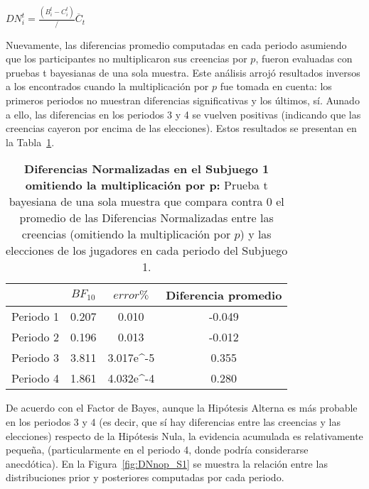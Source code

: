 \begin{center}
$DN_i^t=  \frac{(B_i^t- C_i^t)}/{\overline{C}_t}$ \\
\end{center}

Nuevamente, las diferencias promedio computadas en cada periodo asumiendo que los participantes no multiplicaron sus creencias por $p$, fueron evaluadas con pruebas t bayesianas de una sola muestra.  Este análisis arrojó resultados inversos a los encontrados cuando la multiplicación por $p$ fue tomada en cuenta: los primeros periodos no muestran diferencias significativas y los últimos, sí.  Aunado a ello, las diferencias en los periodos 3 y 4 se vuelven positivas (indicando que las creencias cayeron por encima de las elecciones). Estos resultados se presentan en la Tabla~\ref{DNnop-S1-B}.\\


\begin{table}[h]
\caption[Diferencias Normalizadas en el Subjuego 1, omitiendo la multiplicación por $p$ (prueba t de una muestra)]{\textbf{Diferencias Normalizadas en el Subjuego 1 omitiendo la multiplicación por p:} Prueba t bayesiana de una sola muestra que compara contra 0 el promedio de las Diferencias Normalizadas entre las creencias (omitiendo la multiplicación por $p$) y las elecciones de los jugadores en cada periodo del Subjuego 1.}
\label{DNnop-S1-B}
\centering
\begin{tabular}{l | c c | c}
\toprule
\textbf{} & \textbf{$BF_{10}$} & \textbf{$error\%$} & \textbf{Diferencia promedio}\\
\midrule
Periodo 1 & 0.207 & 0.010 & -0.049\\
Periodo 2 & 0.196 & 0.013 & -0.012\\
Periodo 3 & 3.811 & 3.017e^-5 & 0.355\\
Periodo 4 & 1.861 & 4.032e^-4 & 0.280\\
\bottomrule
\end{tabular}
\end{table}

De acuerdo con el Factor de Bayes, aunque la Hipótesis Alterna es más probable en los periodos 3 y 4 (es decir, que sí hay diferencias entre las creencias y las elecciones) respecto de la Hipótesis Nula, la evidencia acumulada es relativamente pequeña, (particularmente en el periodo 4, donde podría considerarse anecdótica). En la Figura~\ref{fig:DNnop_S1} se muestra la relación entre las distribuciones prior y posteriores computadas por cada periodo.\\

